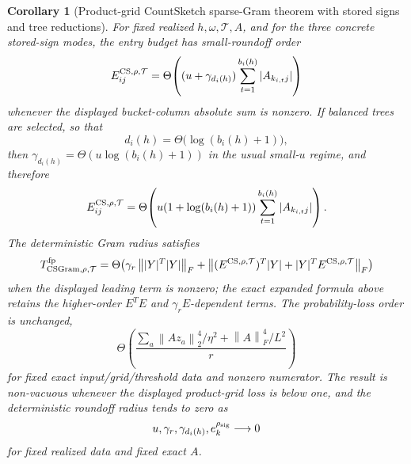 \documentclass[11pt]{article}
\newcommand{\Frob}[1]{\left\lVert #1\right\rVert_F}
\newcommand{\Norm}[1]{\left\lVert #1\right\rVert_2}
\newtheorem{corollary}[theorem]{Corollary}
\theoremstyle{remark}
\begin{document}
\begin{corollary}[Product-grid CountSketch sparse-Gram theorem with stored signs and tree reductions]
For fixed realized \(h,\omega,\mathcal T,A\), and for the three concrete
stored-sign modes, the entry budget has small-roundoff order
\[
  E^{{\rm CS},\rho,\mathcal T}_{ij}
  =
  \Theta\!\left(
    (u+\gamma_{d_i(h)})
    \sum_{t=1}^{b_i(h)}|A_{k_{i,t}j}|
  \right)
\]
whenever the displayed bucket-column absolute sum is nonzero.  If balanced
trees are selected, so that
\[
  d_i(h)=\Theta\!\bigl(\log(b_i(h)+1)\bigr),
\]
then \(\gamma_{d_i(h)}=\Theta(u\log(b_i(h)+1))\) in the usual small-\(u\)
regime, and therefore
\[
  E^{{\rm CS},\rho,\mathcal T}_{ij}
  =
  \Theta\!\left(
    u(1+\log(b_i(h)+1))
    \sum_{t=1}^{b_i(h)}|A_{k_{i,t}j}|
  \right).
\]
The deterministic Gram radius satisfies
\[
  T_{{\rm CSGram},\rho,\mathcal T}^{\rm fp}
  =
  \Theta\!\left(
    \gamma_r\Frob{|Y|^T|Y|}
    +
    \Frob{(E^{{\rm CS},\rho,\mathcal T})^T|Y|
      +|Y|^TE^{{\rm CS},\rho,\mathcal T}}
  \right)
\]
when the displayed leading term is nonzero; the exact expanded formula above
retains the higher-order \(E^TE\) and \(\gamma_r E\)-dependent terms.  The
probability-loss order is unchanged,
\[
  \Theta\!\left(
    \frac{
      \sum_a\Norm{Az_a}^4/\eta^2+\Frob{A}^4/L^2
    }{r}
  \right)
\]
for fixed exact input/grid/threshold data and nonzero numerator.  The result
is non-vacuous whenever the displayed product-grid loss is below one, and the
deterministic roundoff radius tends to zero as
\[
  u,\gamma_r,\gamma_{d_i(h)},e_k^{\rho_{\rm sig}}\longrightarrow0
\]
for fixed realized data and fixed exact \(A\).
\end{corollary}
\end{document}
